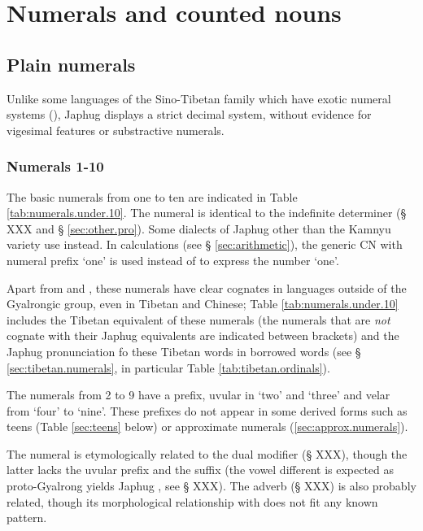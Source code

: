 \chapter{Numerals and counted nouns}

\section{Plain numerals} \label{sec:plain.numerals}
Unlike some languages of the Sino-Tibetan family which have exotic numeral systems (\citealt{mazaudon02nombre}), Japhug displays a strict decimal system, without evidence for vigesimal features or substractive numerals.


\subsection{Numerals 1-10}  \label{sec:one.to.ten}
The basic numerals from one to ten are indicated in Table \ref{tab:numerals.under.10}. The numeral  is identical to the indefinite determiner (§ XXX and § \ref{sec:other.pro}). Some dialects of Japhug other than the Kamnyu variety use  instead. In calculations (see § \ref{sec:arithmetic}), the generic CN with numeral prefix `one'  is used instead of  to express the number `one'.

Apart from  and , these numerals have clear cognates in languages outside of the Gyalrongic group, even in Tibetan and Chinese; Table \ref{tab:numerals.under.10} includes the Tibetan equivalent of these numerals (the numerals that are \textit{not} cognate with their Japhug equivalents are indicated between brackets) and the Japhug pronunciation fo these Tibetan words in borrowed words (see § \ref{sec:tibetan.numerals}, in particular Table \ref{tab:tibetan.ordinals}).

The numerals from 2 to 9 have a prefix, uvular  in `two' and `three' and velar  from `four' to `nine'. These prefixes do not appear in some derived forms such as teens (Table \ref{sec:teens} below) or approximate numerals (\ref{sec:approx.numerals}).

The numeral  is etymologically related to the dual modifier  (§ XXX), though the latter lacks the uvular prefix and the  suffix (the vowel different is expected as proto-Gyalrong  yields Japhug , see § XXX). The adverb  (§ XXX) is also probably related, though its morphological relationship with  does not fit any known pattern.

